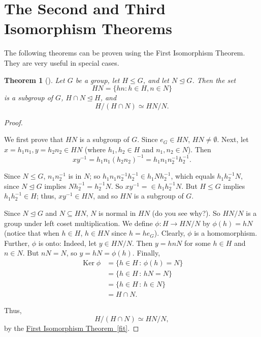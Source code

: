 \documentclass[10pt,]{book}
\theoremstyle{plain}
\newtheorem{theorem}{Theorem}[section]
\theoremstyle{definition}
\theoremstyle{definition}
\theoremstyle{definition}
\theoremstyle{definition}
\numberwithin{equation}{section}
\DeclareMathOperator{\Ker}{Ker}
\newcommand{\amp}{&}
\begin{document}
\section[{The Second and Third Isomorphism Theorems}]{The Second and Third Isomorphism Theorems}\label{section-29}
The following theorems can be proven using the First Isomorphism Theorem. They are very useful in special cases.%
\begin{theorem}[{}]\label{sit}
Let \(G\) be a group, let \(H\leq G\), and let \(N\unlhd G\). Then the set%
\begin{equation*}
HN=\{hn:h\in H, n\in N\}
\end{equation*}
is a subgroup of \(G\), \(H\cap N\unlhd H\), and%
\begin{equation*}
H/(H\cap N) \simeq
HN/N.
\end{equation*}
%
\end{theorem}
\begin{proof}\hypertarget{proof-55}{}
We first prove that \(HN\) is a subgroup of \(G\). Since \(e_G\in
HN\), \(HN\neq \emptyset\). Next, let \(x=h_1n_1, y=h_2n_2\in HN\) (where \(h_1,h_2\in H\) and \(n_1,n_2\in N\)). Then%
\begin{equation*}
xy^{-1}=h_1n_1(h_2n_2)^{-1}=h_1n_1n_2^{-1}h_2^{-1}.
\end{equation*}
%
\par
Since \(N\leq G\), \(n_1n_2^{-1}\) is in \(N\); so \(h_1n_1n_2^{-1}h_2^{-1}\in
h_1Nh_2^{-1}\), which equals \(h_1h_2^{-1}N\), since \(N\unlhd G\) implies \(Nh_2^{-1}=h_2^{-1}N\). So \(xy^{-1}=\in h_1h_2^{-1}N.\) But \(H\leq G\) implies \(h_1h_2^{-1}\in H\); thus, \(xy^{-1}\in HN\), and so \(HN\) is a subgroup of \(G\).%
\par
Since \(N\unlhd G\) and \(N\subseteq HN\), \(N\) is normal in \(HN\) (do you see why?). So \(HN/N\) is a group under left coset multiplication. We define \(\phi: H\to HN/N\) by \(\phi(h)=hN\) (notice that when \(h\in H\), \(h\in HN\) since \(h=he_G\)). Clearly, \(\phi\) is a homomorphism. Further, \(\phi\) is onto: Indeed, let \(y\in HN/N\). Then \(y=hnN\) for some \(h\in H\) and \(n\in N\). But \(nN=N\), so \(y=hN=\phi(h)\). Finally,%
\begin{align*}
\Ker \phi\amp =\{h\in H\,:\, \phi(h)=N\}\\
\amp =\{h\in H\,:\, hN=N\}\\
\amp =\{h\in
H\,:\, h\in N\}\\
\amp =H\cap N.
\end{align*}
%
\par
Thus,%
\begin{equation*}
H/(H\cap N)
\simeq HN/N,
\end{equation*}
by the \hyperref[fit]{First Isomorphism Theorem~\ref{fit}}.%
\end{proof}
\end{document}
